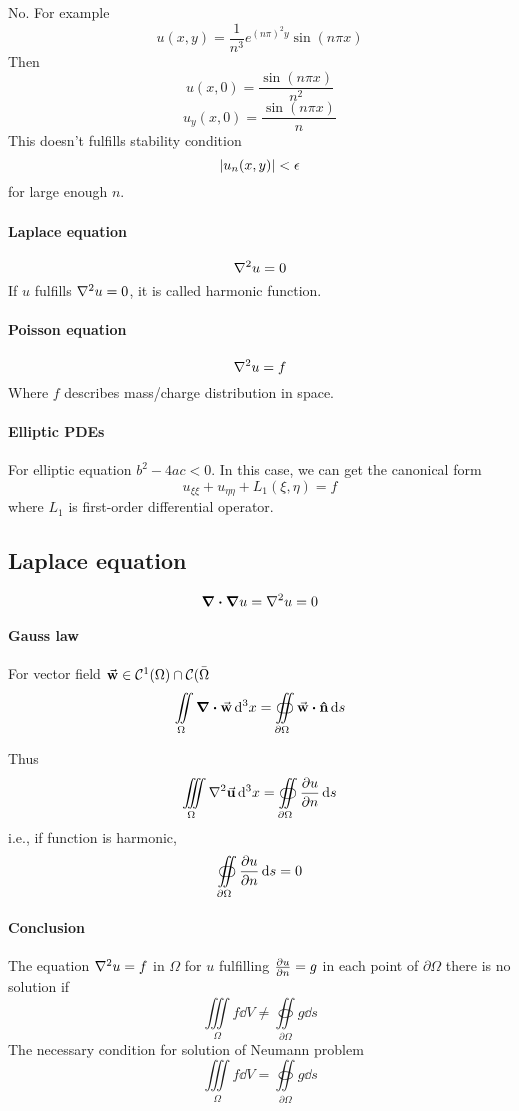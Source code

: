 No. For example
$$u(x,y) = \frac{1}{n^3}e^{(n\pi)^2 y}\sin (n\pi x)$$
Then
$$u(x,0) = \frac{\sin(n\pi x)}{n^2}$$
$$u_y(x,0) = \frac{\sin(n\pi x)}{n}$$
This doesn't fulfills stability condition 
$$\abs{u_n(x,y)}<\epsilon$$
for large enough $n$.
\paragraph{Laplace equation}
$$\laplacian{u} = 0$$
If $u$ fulfills $\laplacian{u} = 0$, it is called harmonic function.
\paragraph{Poisson equation}
$$\laplacian{u} = f$$
Where $f$ describes mass/charge distribution in space.
\paragraph{Elliptic PDEs}
For elliptic equation $b^2-4ac<0$.
In this case, we can get the canonical form
$$u_{\xi\xi} + u_{\eta\eta} + L_1(\xi, \eta) = f$$
where $L_1$ is first-order differential operator.
\subsection{Laplace equation}
$$\div{\grad{u}} = \laplacian{u} = 0$$
\paragraph{Gauss law}
For vector field $\va{w} \in \mathcal{C}^1(\Omega) \cap \mathcal{C}(\bar{\Omega}$ 
$$\iint\limits_{\Omega} \div{\va{w}} \dd[3]{x} =  \oiint\limits_{\partial \Omega} \va{w} \vdot \vu{n} \dd{s}$$

Thus
$$\iiint\limits_{\Omega} \laplacian{\va{u}} \dd[3]{x} = \oiint\limits_{\partial \Omega} \pdv{u}{n} \dd{s}$$
i.e., if function is harmonic,
$$\oiint\limits_{\partial \Omega}  \pdv{u}{n} \dd{s} = 0$$

\paragraph{Conclusion}
The equation $\laplacian{u} = f $ in $\Omega$ for $u$ fulfilling $\pdv{u}{n}  = g$ in each point of  $\partial \Omega$ there is no solution if
$$\iiint\limits_{\Omega} f \dd{V}\neq \oiint\limits_{\partial \Omega} g \dd{s}$$
The necessary condition for solution of Neumann problem 
$$\iiint\limits_{\Omega} f \dd{V}= \oiint\limits_{\partial \Omega} g \dd{s}$$

